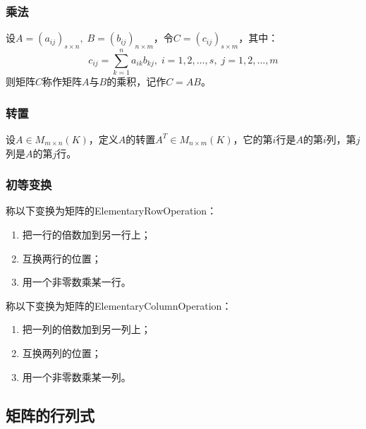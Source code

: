 \subsubsection{乘法}
\begin{definition}
	设$A=(a_{ij})_{s\times n},\;B=(b_{ij})_{n\times m}$，令$C=(c_{ij})_{s\times m}$，其中：
	\begin{equation*}
		c_{ij}=\sum_{k=1}^{n}a_{ik}b_{kj},\;i=1,2,\dots,s,\;j=1,2,\dots,m
	\end{equation*}
	则矩阵$C$称作矩阵$A$与$B$的乘积，记作$C=AB$。
\end{definition}
\subsubsection{转置}
\begin{definition}
	设$A\in M_{m\times n}(K)$，定义$A$的转置$A^T\in M_{n\times m}(K)$，它的第$i$行是$A$的第$i$列，第$j$列是$A$的第$j$行。
\end{definition}
\subsubsection{初等变换}
\begin{definition}
	称以下变换为矩阵的\gls{ElementaryRowOperation}：
	\begin{enumerate}
		\item 把一行的倍数加到另一行上；
		\item 互换两行的位置；
		\item 用一个非零数乘某一行。
	\end{enumerate}
	称以下变换为矩阵的\gls{ElementaryColumnOperation}：
	\begin{enumerate}
		\item 把一列的倍数加到另一列上；
		\item 互换两列的位置；
		\item 用一个非零数乘某一列。
	\end{enumerate}
\end{definition}
\subsection{矩阵的行列式}
